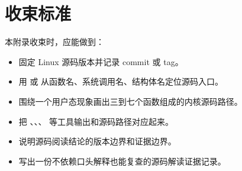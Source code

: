 \section{收束标准}

本附录收束时，应能做到：

\begin{itemize}
  \item 固定 Linux 源码版本并记录 commit 或 tag。
  \item 用  或  从函数名、系统调用名、结构体名定位源码入口。
  \item 围绕一个用户态现象画出三到七个函数组成的内核源码路径。
  \item 把 、、、 等工具输出和源码路径对应起来。
  \item 说明源码阅读结论的版本边界和证据边界。
  \item 写出一份不依赖口头解释也能复查的源码解读证据记录。
\end{itemize}
